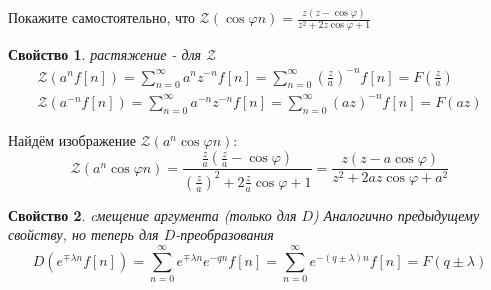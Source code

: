 \documentclass[12pt,twoside]{report}
\newtheorem{property}{Свойство}
\theoremstyle{MyNonumberplain}
\begin{document}
                Покажите самостоятельно, что $\displaystyle \mathcal{Z}(\cos\varphi n)=\frac{z(z-\cos\varphi)}{z^2+2z\cos\varphi+1}$
    
        \begin{property}{растяжение - для $\mathcal{Z}$}
            \begin{eqnarray*}
                \mathcal{Z}(a^n f[n]) = \sum_{n=0}^\infty a^n z^{-n}f[n]=
                \sum_{n=0}^\infty \left(\frac{z}{a}\right)^{-n}f[n]=F\left(\frac{z}{a}\right)\\
                \mathcal{Z}(a^{-n} f[n]) = \sum_{n=0}^\infty a^{-n} z^{-n}f[n]=
                \sum_{n=0}^\infty \left(az\right)^{-n}f[n]=F(az)
            \end{eqnarray*}
        \end{property}
        \begin{example}
            Найдём изображение $\displaystyle \mathcal{Z}(a^n\cos\varphi n)$:
                \begin{equation*}
                    \mathcal{Z}(a^n\cos\varphi n)=\frac{\frac{z}{a}(\frac{z}{a}-\cos\varphi)}{\left(\frac{z}{a}\right)^2+2\frac{z}{a}\cos\varphi+1}
                    =\frac{z(z-a\cos\varphi)}{z^2+2az\cos\varphi+a^2}
                \end{equation*}
        \end{example}

    
        \begin{property}{cмещение аргумента (только для $D$)}
            Аналогично предыдущему свойству, но теперь для $D$-преобразования
                \begin{equation*}
                    D(e^{\mp \lambda n} f[n]) = \sum_{n=0}^\infty e^{\mp \lambda n} e^{-qn}f[n]=
                    \sum_{n=0}^\infty e^{-(q\pm\lambda)n}f[n]=F\left(q\pm\lambda\right)
                \end{equation*}
        \end{property}
    
\end{document}

